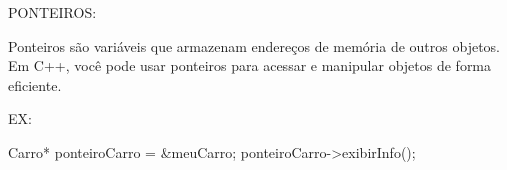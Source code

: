 PONTEIROS:

Ponteiros são variáveis que armazenam endereços de memória de outros objetos.
Em C++, você pode usar ponteiros para acessar e manipular objetos de forma eficiente.

EX:

Carro* ponteiroCarro = &meuCarro;
ponteiroCarro->exibirInfo();